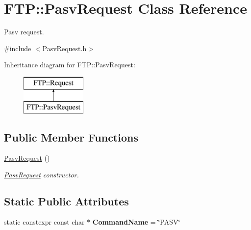 \hypertarget{classFTP_1_1PasvRequest}{}\section{F\+T\+P\+:\+:Pasv\+Request Class Reference}
\label{classFTP_1_1PasvRequest}


Pasv request.  




{\ttfamily \#include $<$Pasv\+Request.\+h$>$}

Inheritance diagram for F\+T\+P\+:\+:Pasv\+Request\+:\begin{figure}[H]
\begin{center}
\leavevmode
\includegraphics[height=2.000000cm]{classFTP_1_1PasvRequest}
\end{center}
\end{figure}
\subsection*{Public Member Functions}
\begin{DoxyCompactItemize}
\item 
\hypertarget{classFTP_1_1PasvRequest_aa78463de945e73db51aebe44bad1892a}{}\hyperlink{classFTP_1_1PasvRequest_aa78463de945e73db51aebe44bad1892a}{Pasv\+Request} ()\label{classFTP_1_1PasvRequest_aa78463de945e73db51aebe44bad1892a}

\begin{DoxyCompactList}\small\item\em \hyperlink{classFTP_1_1PasvRequest}{Pasv\+Request} constructor. \end{DoxyCompactList}\end{DoxyCompactItemize}
\subsection*{Static Public Attributes}
\begin{DoxyCompactItemize}
\item 
\hypertarget{classFTP_1_1PasvRequest_a0524ca195603ca4bd0e7b33a727373e9}{}static constexpr const char $\ast$ {\bfseries Command\+Name} = \char`\"{}P\+A\+S\+V\char`\"{}\label{classFTP_1_1PasvRequest_a0524ca195603ca4bd0e7b33a727373e9}

\end{DoxyCompactItemize}


